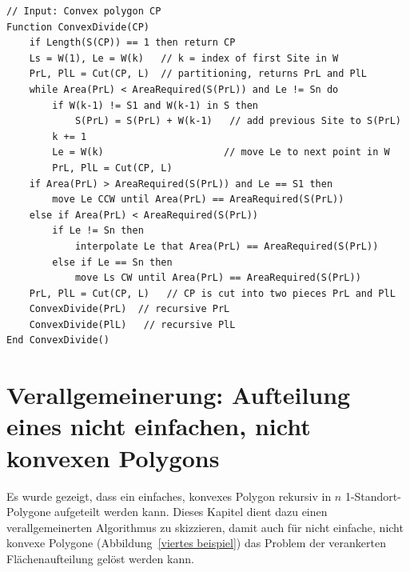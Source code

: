 \documentclass[ngerman]{seminarbeitrag}
\begin{document}
\begin{lstlisting}[float,caption={Mit den Fällen 1 und 2 lässt sich der Algorithmus von \con nun wie folgt erweitern:}, frame=single, label=code konvex]
// Input: Convex polygon CP
Function ConvexDivide(CP)
    if Length(S(CP)) == 1 then return CP 
    Ls = W(1), Le = W(k)   // k = index of first Site in W
    PrL, PlL = Cut(CP, L)  // partitioning, returns PrL and PlL
    while Area(PrL) < AreaRequired(S(PrL)) and Le != Sn do
        if W(k-1) != S1 and W(k-1) in S then 
            S(PrL) = S(PrL) + W(k-1)   // add previous Site to S(PrL)
        k += 1
        Le = W(k)                     // move Le to next point in W
        PrL, PlL = Cut(CP, L)
    if Area(PrL) > AreaRequired(S(PrL)) and Le == S1 then
        move Le CCW until Area(PrL) == AreaRequired(S(PrL))
    else if Area(PrL) < AreaRequired(S(PrL)) 
        if Le != Sn then
            interpolate Le that Area(PrL) == AreaRequired(S(PrL))
        else if Le == Sn then 
            move Ls CW until Area(PrL) == AreaRequired(S(PrL))
    PrL, PlL = Cut(CP, L)	// CP is cut into two pieces PrL and PlL
    ConvexDivide(PrL)  // recursive PrL
    ConvexDivide(PlL)   // recursive PlL
End ConvexDivide()
\end{lstlisting}



\section{Verallgemeinerung: Aufteilung eines nicht einfachen, nicht konvexen Polygons}\label{nicht konvex}
Es wurde gezeigt, dass ein einfaches, konvexes Polygon rekursiv in $n$ 1-Standort-Polygone aufgeteilt werden kann. Dieses Kapitel dient dazu einen verallgemeinerten Algorithmus zu skizzieren, damit auch für nicht einfache, nicht konvexe Polygone (Abbildung~\ref{viertes beispiel}) das Problem der verankerten Flächenaufteilung gelöst werden kann.
\end{document}
